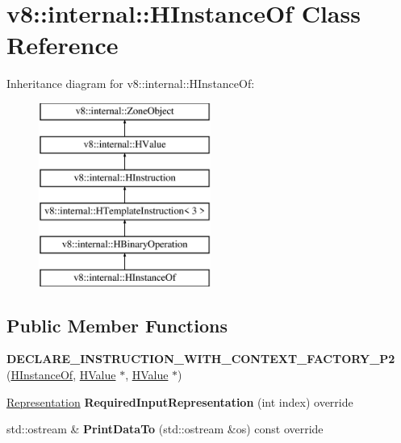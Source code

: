 \hypertarget{classv8_1_1internal_1_1_h_instance_of}{}\section{v8\+:\+:internal\+:\+:H\+Instance\+Of Class Reference}
\label{classv8_1_1internal_1_1_h_instance_of}
Inheritance diagram for v8\+:\+:internal\+:\+:H\+Instance\+Of\+:\begin{figure}[H]
\begin{center}
\leavevmode
\includegraphics[height=6.000000cm]{classv8_1_1internal_1_1_h_instance_of}
\end{center}
\end{figure}
\subsection*{Public Member Functions}
\begin{DoxyCompactItemize}
\item 
{\bfseries D\+E\+C\+L\+A\+R\+E\+\_\+\+I\+N\+S\+T\+R\+U\+C\+T\+I\+O\+N\+\_\+\+W\+I\+T\+H\+\_\+\+C\+O\+N\+T\+E\+X\+T\+\_\+\+F\+A\+C\+T\+O\+R\+Y\+\_\+\+P2} (\hyperlink{classv8_1_1internal_1_1_h_instance_of}{H\+Instance\+Of}, \hyperlink{classv8_1_1internal_1_1_h_value}{H\+Value} $\ast$, \hyperlink{classv8_1_1internal_1_1_h_value}{H\+Value} $\ast$)\hypertarget{classv8_1_1internal_1_1_h_instance_of_a1ea996543184ed7123ccc94526030ef0}{}\label{classv8_1_1internal_1_1_h_instance_of_a1ea996543184ed7123ccc94526030ef0}

\item 
\hyperlink{classv8_1_1internal_1_1_representation}{Representation} {\bfseries Required\+Input\+Representation} (int index) override\hypertarget{classv8_1_1internal_1_1_h_instance_of_a6459d624a5497a10c32742a00a15c0df}{}\label{classv8_1_1internal_1_1_h_instance_of_a6459d624a5497a10c32742a00a15c0df}

\item 
std\+::ostream \& {\bfseries Print\+Data\+To} (std\+::ostream \&os) const  override\hypertarget{classv8_1_1internal_1_1_h_instance_of_acc82195ca09e4523b2f0664fa8d2f7ad}{}\label{classv8_1_1internal_1_1_h_instance_of_acc82195ca09e4523b2f0664fa8d2f7ad}

\end{DoxyCompactItemize}
